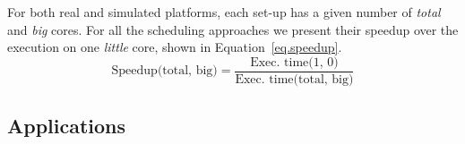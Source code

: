 


%

For both real and simulated platforms, each set-up has a given number of \textit{total} and \textit{big} cores.
For all the scheduling approaches we present their speedup over the execution on one \textit{little} core, shown in Equation~\ref{eq.speedup}. 
\begingroup\makeatletter\def\f@size{8}\check@mathfonts
\begin{equation}
  \text{Speedup(total, big)} = \frac{\text{Exec. time(1, 0)}}{\text{Exec. time(total, big)}}
  \label{eq.speedup}
\end{equation}
\endgroup


\subsection{Applications}

